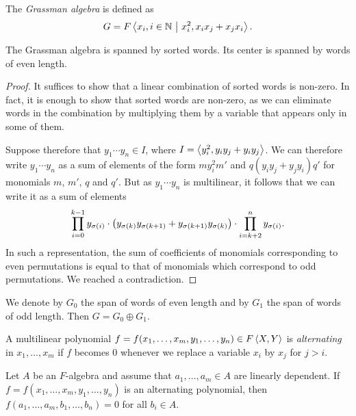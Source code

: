 \begin{definicija}
The \emph{Grassman algebra} is defined as
\[
G = F \left\langle x_i, i \in \mathbb{N}~\middle\vert~x_i^2, x_i x_j + x_j x_i\right\rangle.
\]
\end{definicija}

\begin{trditev}
The Grassman algebra is spanned by sorted words. Its center is
spanned by words of even length.
\end{trditev}

\begin{proof}
It suffices to show that a linear combination of sorted words is
non-zero. In fact, it is enough to show that sorted words are
non-zero, as we can eliminate words in the combination by
multiplying them by a variable that appears only in some of them.

Suppose therefore that $y_1 \cdots y_n \in I$, where
$I = \left\langle y_i^2, y_i y_j + y_i y_j\right\rangle$. We can therefore write
$y_1 \cdots y_n$ as a sum of elements of the form $m y_i^2 m'$ and
$q (y_i y_j + y_j y_i) q'$ for monomials $m$, $m'$, $q$ and $q'$.
But as $y_1 \cdots y_n$ is multilinear, it follows that we can
write it as a sum of elements
\[
\prod_{i=0}^{k-1} y_{\sigma(i)} \cdot
\left(y_{\sigma(k)} y_{\sigma(k+1)} +
y_{\sigma(k+1)} y_{\sigma(k)}\right) \cdot
\prod_{i=k+2}^n y_{\sigma(i)}.
\]
In such a representation, the sum of coefficients of monomials
corresponding to even permutations is equal to that of monomials
which correspond to odd permutations. We reached a contradiction.
\end{proof}

\begin{opomba}
We denote by $G_0$ the span of words of even length and by $G_1$
the span of words of odd length. Then $G = G_0 \oplus G_1$.
\end{opomba}

\begin{definicija}
A multilinear polynomial
$f = f(x_1, \dots, x_m, y_1, \dots, y_n) \in F \left\langle X, Y\right\rangle$ is
\emph{alternating} in
$x_1, \dots, x_m$ if $f$ becomes $0$ whenever we replace a variable
$x_i$ by $x_j$ for $j > i$.
\end{definicija}

\begin{trditev}
Let $A$ be an $F$-algebra and assume that $a_1, \dots, a_m \in A$
are linearly dependent. If
$f = f(x_1, \dots, x_m, y_1, \dots, y_n)$ is an alternating
polynomial, then $f(a_1, \dots, a_m, b_1, \dots, b_n) = 0$ for all
$b_i \in A$.
\end{trditev}

